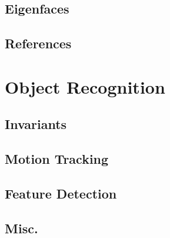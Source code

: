 \subsection{Eigenfaces}
\subsection{References}
\section{Object Recognition}
\subsection{Invariants}
\subsection{Motion Tracking}
\subsection{Feature Detection}
\subsection{Misc.}